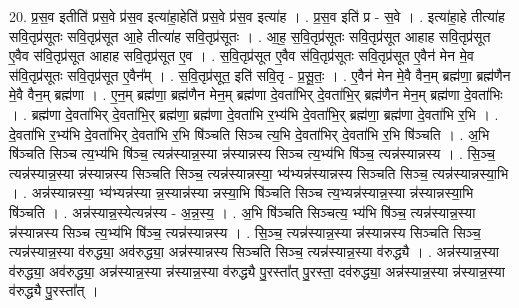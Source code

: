 \documentclass[17pt]{extarticle}
\begin{document}
20. प्र॒स॒व इतीति॑ प्रस॒वे प्र॑स॒व इत्या॑हा॒हेति॑ प्रस॒वे प्र॑स॒व इत्या॑ह । . प्र॒स॒व इति॑ प्र - स॒वे । . इत्या॑हा॒हे तीत्या॑ह सवि॒तृप्र॑सूतः सवि॒तृप्र॑सूत आ॒हे तीत्या॑ह सवि॒तृप्र॑सूतः । . आ॒ह॒ स॒वि॒तृप्र॑सूतः सवि॒तृप्र॑सूत आहाह सवि॒तृप्र॑सूत ए॒वैव स॑वि॒तृप्र॑सूत आहाह सवि॒तृप्र॑सूत ए॒व । . स॒वि॒तृप्र॑सूत ए॒वैव स॑वि॒तृप्र॑सूतः सवि॒तृप्र॑सूत ए॒वैन॑ मेन मे॒व स॑वि॒तृप्र॑सूतः सवि॒तृप्र॑सूत ए॒वैन᳚म् । . स॒वि॒तृप्र॑सूत॒ इति॑ सवि॒तृ - प्र॒सू॒तः॒ । . ए॒वैन॑ मेन मे॒वै वैन॒म् ब्रह्म॑णा॒ ब्रह्म॑णैन मे॒वै वैन॒म् ब्रह्म॑णा । . ए॒न॒म् ब्रह्म॑णा॒ ब्रह्म॑णैन मेन॒म् ब्रह्म॑णा दे॒वता॑भिर् दे॒वता॑भि॒र् ब्रह्म॑णैन मेन॒म् ब्रह्म॑णा दे॒वता॑भिः । . ब्रह्म॑णा दे॒वता॑भिर् दे॒वता॑भि॒र् ब्रह्म॑णा॒ ब्रह्म॑णा दे॒वता॑भि र॒भ्य॑भि दे॒वता॑भि॒र् ब्रह्म॑णा॒ ब्रह्म॑णा दे॒वता॑भि र॒भि । . दे॒वता॑भि र॒भ्य॑भि दे॒वता॑भिर् दे॒वता॑भि र॒भि षि॑ञ्चति सिञ्च त्य॒भि दे॒वता॑भिर् दे॒वता॑भि र॒भि षि॑ञ्चति । . अ॒भि षि॑ञ्चति सिञ्च त्य॒भ्य॑भि षि॑ञ्च॒ त्यन्न॑स्यान्न॒स्या न्न॑स्यान्नस्य सिञ्च त्य॒भ्य॑भि षि॑ञ्च॒
त्यन्न॑स्यान्नस्य । . सि॒ञ्च॒ त्यन्न॑स्यान्न॒स्या न्न॑स्यान्नस्य सिञ्चति सिञ्च॒ त्यन्न॑स्यान्नस्या॒ भ्य॑भ्यन्न॑स्यान्नस्य सिञ्चति सिञ्च॒ त्यन्न॑स्यान्नस्या॒भि । . अन्न॑स्यान्नस्या॒ भ्य॑भ्यन्न॑स्या न्न॒स्यान्न॑स्या न्नस्या॒भि षि॑ञ्चति सिञ्च त्य॒भ्यन्न॑स्यान्न॒स्या न्न॑स्यान्नस्या॒भि षि॑ञ्चति । . अन्न॑स्यान्न॒स्येत्यन्न॑स्य - अ॒न्न॒स्य॒ । . अ॒भि षि॑ञ्चति सिञ्चत्य॒ भ्य॑भि षि॑ञ्च॒ त्यन्न॑स्यान्न॒स्या न्न॑स्यान्नस्य सिञ्च त्य॒भ्य॑भि षि॑ञ्च॒
त्यन्न॑स्यान्नस्य । . सि॒ञ्च॒ त्यन्न॑स्यान्न॒स्या न्न॑स्यान्नस्य सिञ्चति सिञ्च॒ त्यन्न॑स्यान्न॒स्या व॑रुद्ध्या॒ अव॑रुद्ध्या॒ अन्न॑स्यान्नस्य सिञ्चति सिञ्च॒ त्यन्न॑स्यान्न॒स्या व॑रुद्ध्यै । . अन्न॑स्यान्न॒स्या व॑रुद्ध्या॒ अव॑रुद्ध्या॒ अन्न॑स्यान्न॒स्या न्न॑स्यान्न॒स्या व॑रुद्ध्यै पु॒रस्ता᳚त् पु॒रस्ता॒ दव॑रुद्ध्या॒ अन्न॑स्यान्न॒स्या न्न॑स्यान्न॒स्या व॑रुद्ध्यै पु॒रस्ता᳚त् । \newline
\end{document}
